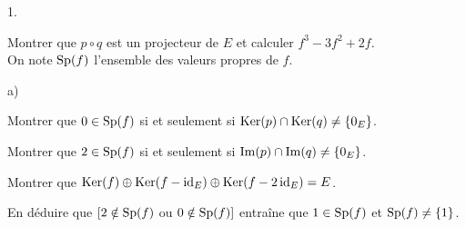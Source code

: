 \documentclass[11pt]{article}%
\begin{document}
\begin{noliste}{1.}
\item
Montrer que $p\circ q$ est un projecteur de $E$ et calculer
$f^3-3f^2+2f$.\\
On note $\operatorname{Sp}(f)$ l'ensemble des valeurs propres de $f$.

\item
\begin{noliste}{a)}
\item
 Montrer que $0\in\operatorname{Sp}(f)$ si et seulement si $\operatorname{Ker}(p)\cap\operatorname{Ker}(q) \neq 
 \{0_E\}$.

\item
Montrer que $2\in\operatorname{Sp}(f)$ si et seulement si $\operatorname{Im}(p)\cap \operatorname{Im}(q)\neq 
\{0_E\}$.

\item
Montrer que $\operatorname{Ker}(f)\oplus \operatorname{Ker}(f- {\rm{id}}_E)\oplus\operatorname{Ker}(f-2 \, {\rm{id}}_E)=E$.

\end{noliste}

\item
En déduire que $[2\notin\operatorname{Sp}(f)$ ou $0\notin\operatorname{Sp} (f)]$
entraîne
que $1\in\operatorname{Sp}(f)$ et $\operatorname{Sp}(f)\neq\{1\}$.
\end{noliste}


\newpage
\end{document}
